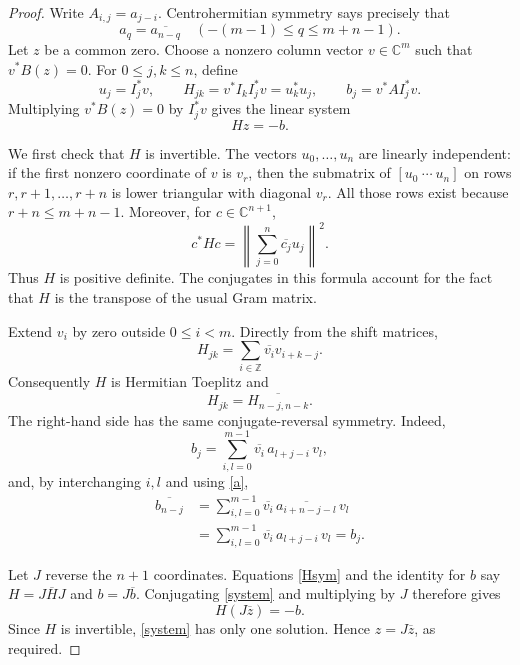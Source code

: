 \documentclass[11pt]{article}
\begin{document}
\begin{proof}
Write $A_{i,j}=a_{j-i}$. Centrohermitian symmetry says precisely that
\begin{equation}\label{a}
 a_q=\overline{a_{n-q}}
 \quad (-(m-1)\leq q\leq m+n-1).
\end{equation}
Let $z$ be a common zero. Choose a nonzero column vector
$v\in\mathbb C^m$ such that $v^*B(z)=0$. For $0\leq j,k\leq n$, define
\[
 u_j=I_j^*v,\qquad
 H_{jk}=v^*I_kI_j^*v=u_k^*u_j,\qquad
 b_j=v^*AI_j^*v.
\]
Multiplying $v^*B(z)=0$ by $I_j^*v$ gives the linear system
\begin{equation}\label{system}
 Hz=-b.
\end{equation}

We first check that $H$ is invertible. The vectors $u_0,\ldots,u_n$
are linearly independent: if the first nonzero coordinate of $v$ is
$v_r$, then the submatrix of $[u_0\ \cdots\ u_n]$ on rows
$r,r+1,\ldots,r+n$ is lower triangular with diagonal $v_r$.
All those rows exist because $r+n\leq m+n-1$.
Moreover, for $c\in\mathbb C^{n+1}$,
\[
 c^*Hc=\left\|\sum_{j=0}^n\overline{c_j}u_j\right\|^2.
\]
Thus $H$ is positive definite. The conjugates in this formula account
for the fact that $H$ is the transpose of the usual Gram matrix.

Extend $v_i$ by zero outside $0\leq i<m$. Directly from the shift
matrices,
\begin{equation}\label{H}
 H_{jk}=\sum_{i\in\mathbb Z}\overline{v_i}v_{i+k-j}.
\end{equation}
Consequently $H$ is Hermitian Toeplitz and
\begin{equation}\label{Hsym}
 H_{jk}=\overline{H_{n-j,n-k}}.
\end{equation}
The right-hand side has the same conjugate-reversal symmetry.
Indeed,
\[
 b_j=\sum_{i,l=0}^{m-1}\overline{v_i}\,a_{l+j-i}\,v_l,
\]
and, by interchanging $i,l$ and using \eqref{a},
\begin{align*}
 \overline{b_{n-j}}
 &=\sum_{i,l=0}^{m-1}\overline{v_i}\,
      \overline{a_{i+n-j-l}}\,v_l\\
 &=\sum_{i,l=0}^{m-1}\overline{v_i}\,a_{l+j-i}\,v_l=b_j.
\end{align*}

Let $J$ reverse the $n+1$ coordinates. Equations \eqref{Hsym} and
the identity for $b$ say $H=J\overline HJ$ and $b=J\overline b$.
Conjugating \eqref{system} and multiplying by $J$ therefore gives
\[
 H(J\overline z)=-b.
\]
Since $H$ is invertible, \eqref{system} has only one solution.
Hence $z=J\overline z$, as required.
\end{proof}
\end{document}
